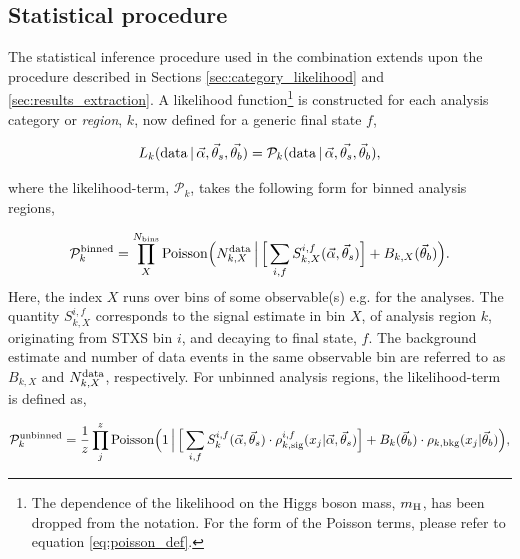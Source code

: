 \subsection{Statistical procedure}
The statistical inference procedure used in the combination extends upon the procedure described in Sections \ref{sec:category_likelihood} and \ref{sec:results_extraction}. A likelihood function\footnote{The dependence of the likelihood on the Higgs boson mass, $m_{\rm{H}}$, has been dropped from the notation. For the form of the Poisson terms, please refer to equation \ref{eq:poisson_def}.} is constructed for each analysis category or \textit{region}, $k$, now defined for a generic final state $f$,

\begin{equation}
    L_k({\rm{data}}\,|\,\vec{\alpha},\vec{\theta}_s,\vec{\theta_b}) = \mathcal{P}_k( {\rm{data}}\,|\,\vec{\alpha},\vec{\theta_s},\vec{\theta}_b),
\end{equation}

\noindent
where the likelihood-term, $\mathcal{P}_k$, takes the following form for binned analysis regions,

\begin{equation}
    \mathcal{P}^{\rm{binned}}_k = \prod^{N_{\rm{bins}}}_X {\rm{Poisson}}\Big( N^{\rm{data}}_{k,X} \, \Big| \, \Big[\sum_{i,f} S^{i,f}_{k,X}(\vec{\alpha},\vec{\theta}_s) \Big] + B_{k,X}(\vec{\theta}_b) \Big).  
\end{equation}
\noindent
Here, the index $X$ runs over bins of some observable(s) e.g. \mgg for the \Hgg analyses. The quantity $S^{i,f}_{k,X}$ corresponds to the signal estimate in bin $X$, of analysis region $k$, originating from STXS bin $i$, and decaying to final state, $f$. The background estimate and number of data events in the same observable bin are referred to as $B_{k,X}$ and $N^{\rm{data}}_{k,X}$, respectively. For unbinned analysis regions, the likelihood-term is defined as,

\begin{equation}
    \mathcal{P}^{\rm{unbinned}}_k = \frac{1}{z} \prod^{z}_j {\rm{Poisson}}\Big(1 \, \Big| \, \Big[\sum_{i,f} S^{i,f}_{k}(\vec{\alpha},\vec{\theta}_s) \cdot \rho^{i,f}_{k,{\rm{sig}}}(x_j|\vec{\alpha},\vec{\theta}_s) \Big] + B_{k}(\vec{\theta}_b)\cdot \rho_{k,{\rm{bkg}}}(x_j|\vec{\theta}_b) \Big),
\end{equation}


